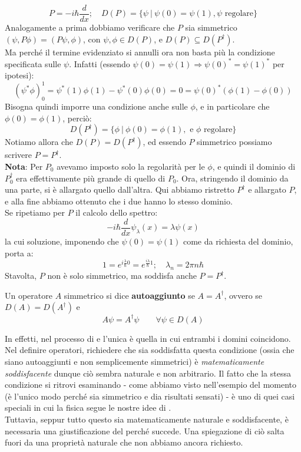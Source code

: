 \[
P=-i\hbar\frac{d}{dx}; \quad D(P) = \{\psi\>|\> \psi(0) = \psi(1), \psi \text{ regolare}\}
\] %
Analogamente a prima dobbiamo verificare che $P$ sia simmetrico $\left(\psi, P\phi\right)=(P\psi,\phi)$, con $\psi, \phi \in D(P)$, e $D(P)\subseteq D(P^\dag)$.\\
Ma perché il termine evidenziato si annulli ora non basta più la condizione specificata sulle $\psi$. Infatti (essendo $\psi(0) = \psi(1) \Rightarrow \psi(0)^* = \psi(1)^*$ per ipotesi):
\[
(\psi^* \phi)_0^1 = \psi^*(1)\phi(1) - \psi^*(0)\phi(0) = 0 = \psi(0)^*(\phi(1)-\phi(0))
\]
Bisogna quindi imporre una condizione anche sulle $\phi$, e in particolare che $\phi\left(0\right)= \phi\left(1\right)$, perciò:
\[
D(P^\dag) = \{ \phi \>|\> \phi(0) = \phi(1), \text{ e $\phi$ regolare}\}
\]
Notiamo allora che $D(P) = D(P^\dag)$, ed essendo $P$ simmetrico possiamo scrivere $P=P^\dag$.\\
\textbf{Nota}: Per $P_0$ avevamo imposto solo la regolarità per le $\phi$, e quindi il dominio di $P_0^\dag$ era effettivamente più grande di quello di $P_0$. Ora, stringendo il dominio da una parte, si è allargato quello dall'altra. Qui abbiamo ristretto $P^\dag$ e allargato $P$, e alla fine abbiamo ottenuto che i due hanno lo stesso dominio.\\
Se ripetiamo per $P$ il calcolo dello spettro:
\[
-i\hbar\frac{d}{dx}\psi_\lambda\left(x\right)=\lambda\psi\left(x\right)
\]
la cui soluzione, imponendo che $\psi\left(0\right)=\psi\left(1\right)$ come da richiesta del dominio, porta a:
\[
1=e^{i\frac{\lambda}{\hbar}0}=e^{\frac{i\lambda}{\hbar}1};\quad \lambda_n=2\pi n\hbar
\]
Stavolta, $P$ non è solo simmetrico, ma soddisfa anche $P=P^\dag$.

\begin{dfn}
Un operatore $A$ simmetrico si dice \textbf{autoaggiunto} se $A=A^\dag$, ovvero se $D\left(A\right)=D\left(A^\dag\right)$ e 
\[
A\psi=A^\dag\psi \qquad \forall\psi\in D(A)
\]
\end{dfn}
In effetti, nel processo di  e  l'unica  è quella in cui entrambi i domini coincidono. Nel definire operatori, richiedere che sia soddisfatta questa condizione (ossia che siano autoaggiunti e non semplicemente simmetrici) è \textit{matematicamente soddisfacente} dunque ciò sembra naturale e non arbitrario.
Il fatto che la stessa condizione si ritrovi esaminando  - come abbiamo visto nell'esempio del momento (è l'unico modo perché sia simmetrico e dia risultati sensati) - è uno di quei casi speciali in cui la fisica segue le nostre idee di .\\
Tuttavia, seppur tutto questo sia matematicamente naturale e soddisfacente, è necessaria una giustificazione  del perché succede. Una spiegazione di ciò salta fuori da una proprietà naturale che non abbiamo ancora richiesto.\\

